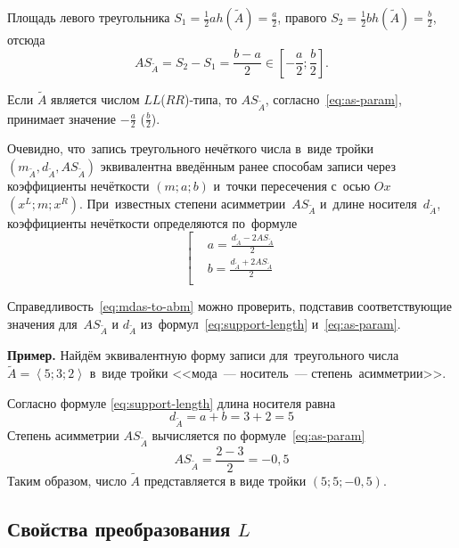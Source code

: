 Площадь левого треугольника $\displaystyle S_1=\frac{1}{2}ah(\tilde A)=\frac{a}{2}$, правого $\displaystyle S_2=\frac{1}{2}bh\left(\tilde A \right)=\frac{b}{2}$, отсюда
\begin{equation}
\label{eq:as-param}
  AS_{\tilde A}=S_2-S_1=\frac{b-a}{2}\in \left[ -\frac{a}{2};\frac{b}{2} \right].
\end{equation}

Если $\tilde{A}$ является числом $LL$($RR$)-типа, то $AS_{\tilde A}$, согласно~\eqref{eq:as-param}, принимает значение $\displaystyle -\frac{a}{2}$ ($\displaystyle \frac{b}{2}$).

Очевидно, что~запись треугольного нечёткого числа в~виде тройки $\left(m_{\tilde A}, d_{\tilde A}, AS_{\tilde A} \right)$ эквивалентна введённым ранее способам записи через коэффициенты нечёткости $\left( m;a;b \right)$ и~точки пересечения с~осью $Ox$ $\left( x^L;m;x^R \right)$. При~известных степени асимметрии~$AS_{\tilde A}$ и~длине носителя~$d_{\tilde A}$, коэффициенты нечёткости определяются по~формуле
\begin{equation}
\label{eq:mdas-to-abm}
	\left[ \begin{aligned}
      & a=\frac{d_{\tilde A}-2AS_{\tilde A}}{2} \\ 
      & b=\frac{d_{\tilde A}+2AS_{\tilde A}}{2} \\ 
    \end{aligned} \right.
\end{equation}

Справедливость~\eqref{eq:mdas-to-abm} можно проверить, подставив соответствующие значения для~$AS_{\tilde A}$ и $d_{\tilde A}$ из~формул~\eqref{eq:support-length} и~\eqref{eq:as-param}.

\textbf{Пример.} Найдём эквивалентную форму записи для~треугольного числа $\tilde{A}=\left\langle 5;3;2 \right\rangle $ в~виде тройки <<мода~--- носитель~--- степень~асимметрии>>.

Согласно формуле \eqref{eq:support-length} длина носителя равна
\begin{equation*}
  d_{\tilde A}=a+b=3+2=5
\end{equation*}
Степень асимметрии $AS_{\tilde A}$ вычисляется по формуле~\eqref{eq:as-param}
\begin{equation*}
  AS_{\tilde A}=\frac{2-3}{2}=-0,5
\end{equation*}
Таким образом, число $\tilde{A}$ представляется в виде тройки $\left( 5;5;-0,5 \right)$.

\subsection{Свойства преобразования $L$}

